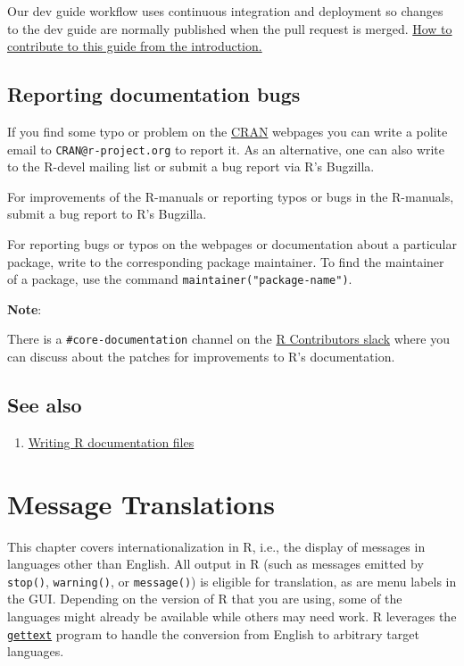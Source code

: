 \documentclass[
]{book}
\providecommand{\tightlist}{%
  \setlength{\itemsep}{0pt}\setlength{\parskip}{0pt}}
\begin{document}
Our dev guide workflow uses continuous integration and deployment so changes to the dev guide are normally published when the pull request is merged. \hyperref[how-to-contribute-to-this-guide]{How to contribute to this guide from the introduction.}

\section{Reporting documentation bugs}\label{reporting-documentation-bugs}

If you find some typo or problem on the \href{https://cran.r-project.org}{CRAN} webpages you can write a polite email to \texttt{CRAN@r-project.org} to report it. As an alternative, one can also write to the R-devel mailing list or submit a bug report via R's Bugzilla.

For improvements of the R-manuals or reporting typos or bugs in the R-manuals, submit a bug report to R's Bugzilla.

For reporting bugs or typos on the webpages or documentation about a particular package, write to the corresponding package maintainer. To find the maintainer of a package, use the command \texttt{maintainer("package-name")}.

\textbf{Note}:

There is a \texttt{\#core-documentation} channel on the \href{https://r-contributors.slack.com/}{R Contributors slack} where you can discuss about the patches for improvements to R's documentation.

\section{See also}\label{see-also-5}

\begin{enumerate}
\def\labelenumi{\arabic{enumi}.}
\tightlist
\item
  \href{https://cran.r-project.org/doc/manuals/r-release/R-exts.html\#Writing-R-documentation-files}{Writing R documentation files}
\end{enumerate}

\chapter{Message Translations}\label{message-translations}

This chapter covers internationalization in R, i.e., the display of
messages in languages other than English. All output in R (such as
messages emitted by \texttt{stop()}, \texttt{warning()}, or \texttt{message()}) is eligible
for translation, as are menu labels in the GUI. Depending on the version
of R that you are using, some of the languages might already be
available while others may need work. R leverages the
\href{https://www.gnu.org/software/gettext/}{\texttt{gettext}} program to handle the
conversion from English to arbitrary target languages.
\end{document}
